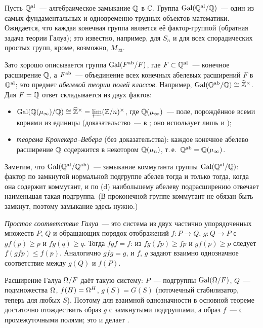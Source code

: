 \begin{example}
Пусть $\mathbb Q^{\mathrm{al}}$~--- алгебраическое замыкание $\mathbb Q$ в $\mathbb C$. Группа $\operatorname{Gal}(\mathbb Q^{\mathrm{al}}/\mathbb Q)$~--- один из самых фундаментальных и
одновременно трудных объектов математики. Ожидается, что каждая конечная группа является её фактор-группой (обратная
задача теории Галуа); это известно, например, для $S_n$ и для всех спорадических простых групп, кроме, возможно, $M_{23}$.

Зато хорошо описывается группа $\operatorname{Gal}(F^{\rm ab}/F)$, где $F\subset\mathbb Q^{\mathrm{al}}$~--- конечное расширение $\mathbb Q$, а
$F^{\rm ab}$~--- объединение всех конечных абелевых расширений $F$ в $\mathbb Q^{\mathrm{al}}$; это предмет \emph{абелевой теории полей
классов}. Например, $\operatorname{Gal}(\mathbb Q^{\mathrm{ab}}/\mathbb Q)\cong\widehat{\mathbb Z}^\times$. Для $F=\mathbb Q$ ответ складывается из двух фактов:
\begin{itemize}[leftmargin=*]
\item $\operatorname{Gal}(\mathbb Q(\mu_\infty)/\mathbb Q)\cong\widehat{\mathbb Z}^\times=\varprojlim(\mathbb Z/n)^\times$, где $\mathbb Q(\mu_\infty)$~--- поле, порождённое всеми
корнями из единицы (доказательство~--- в ; оно использует лишь  и );
\item \emph{теорема Кронекера--Вебера} (без доказательства): каждое конечное абелево расширение $\mathbb Q$ содержится в
некотором $\mathbb Q(\mu_n)$, т.\,е.\ $\mathbb Q^{\mathrm{ab}}=\mathbb Q(\mu_\infty)$.
\end{itemize}
Заметим, что $\operatorname{Gal}(\mathbb Q^{\mathrm{al}}/\mathbb Q^{\mathrm{ab}})$~--- замыкание коммутанта группы $\operatorname{Gal}(\mathbb Q^{\mathrm{al}}/\mathbb Q)$: фактор по замкнутой нормальной
подгруппе абелев тогда и только тогда, когда она содержит коммутант, и по (d) наибольшему абелеву подрасширению
отвечает наименьшая такая подгруппа. (В проконечной группе коммутант не обязан быть замкнут, поэтому замыкание здесь
нужно.)
\end{example}

\begin{aside}[7.19]
\emph{Простое соответствие Галуа}~--- это система из двух частично упорядоченных множеств $P$, $Q$ и обращающих порядок
отображений $f\colon P\to Q$, $g\colon Q\to P$ с $gf(p)\ge p$ и $fg(q)\ge q$. Тогда $fgf=f$: из $fg(fp)\ge fp$ и $gf(p)\ge
p$ следует $f(gfp)\le f(p)$. Аналогично $gfg=g$, и $f$, $g$ задают взаимно однозначное соответствие между $g(Q)$ и
$f(P)$.

Расширение Галуа $\Omega/F$ даёт такую систему: $P$~--- подгруппы $\operatorname{Gal}(\Omega/F)$, $Q$~--- подмножества $\Omega$,
$f(H)=\Omega^H$, $g(S)=G(S)$ (поточечный стабилизатор, теперь для любых $S$). Поэтому для взаимной однозначности в основной
теореме достаточно отождествить образ $g$ с замкнутыми подгруппами, а образ $f$~--- с промежуточными полями; это и
делает .
\end{aside}
